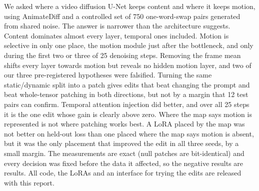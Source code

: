 \documentclass[twoside,english]{article}
\begin{document}
We asked where a video diffusion U-Net keeps content and where it keeps motion, using AnimateDiff and a
controlled set of 750 one-word-swap pairs generated from shared noise. The answer is narrower than the
architecture suggests. Content dominates almost every layer, temporal ones included. Motion is selective
in only one place, the motion module just after the bottleneck, and only during the first two or three of
25 denoising steps. Removing the frame mean shifts every layer towards motion but reveals no hidden motion
layer, and two of our three pre-registered hypotheses were falsified. Turning the same static/dynamic
split into a patch gives edits that beat changing the prompt and beat whole-tensor patching in both
directions, but not by a margin that 12 test pairs can confirm. Temporal attention injection did
better, and over all 25 steps it is the one edit whose gain is clearly above zero. Where the map says
motion is represented is not where patching works best. A LoRA placed by the map was not better on
held-out loss than one placed where the map says motion is absent, but it was the only placement that
improved the edit in all three seeds, by a small margin. The
measurements are exact (null patches are bit-identical) and every decision was fixed before the data it
affected, so the negative results are results. All code, the LoRAs and an interface for trying the edits
are released with this report.
\end{document}
